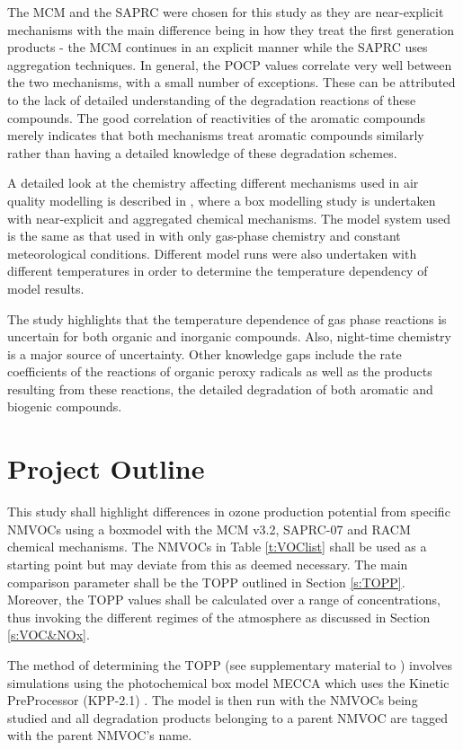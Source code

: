 The MCM and the SAPRC were chosen for this study as they are near-explicit mechanisms with the main difference being in how they
treat the first generation products - the MCM continues in an explicit manner while the SAPRC uses aggregation techniques. In 
general, the POCP values correlate very well between the two mechanisms, with a small number of exceptions. These can be 
attributed to the lack of detailed understanding of the degradation reactions of these compounds. The good correlation of 
reactivities of the aromatic compounds merely indicates that both mechanisms treat aromatic compounds similarly rather than 
having a detailed knowledge of these degradation schemes.

A detailed look at the chemistry affecting different mechanisms used in air quality modelling is described in 
\citep{Stockwell:2012}, where a box modelling study is undertaken with near-explicit and aggregated chemical mechanisms. The 
model system used is the same as that used in \citep{Seefeld:1999} with only gas-phase chemistry and constant meteorological 
conditions.  Different model runs were also undertaken with different temperatures in order to determine the temperature 
dependency of model results. 

The study highlights that the temperature dependence of gas phase reactions is uncertain for both organic and inorganic 
compounds. Also, night-time chemistry is a major source of uncertainty. Other knowledge gaps include the rate coefficients of 
the reactions of organic peroxy radicals as well as the products resulting from these reactions, the detailed degradation of 
both aromatic and biogenic compounds.

\section{Project Outline}
This study shall highlight differences in ozone production potential from specific NMVOCs using a boxmodel with the MCM v3.2, 
SAPRC-07 and RACM chemical mechanisms. The NMVOCs in Table \ref{t:VOClist} shall be used as a starting point but may deviate 
from this as deemed necessary. The main comparison parameter shall be the TOPP outlined in Section \ref{s:TOPP}. Moreover, the 
TOPP values shall be calculated over a range of  concentrations, thus invoking the different regimes of the atmosphere 
as discussed in Section \ref{s:VOC&NOx}.

The method of determining the TOPP (see supplementary material to \citep{Butler:2011}) involves simulations using the 
photochemical box model MECCA \citep{Sander:2005, Sander:2011} which uses the Kinetic PreProcessor (KPP-2.1) \citep{Sandu:2006}. 
The model is then run with the NMVOCs being studied and all degradation products belonging to a parent NMVOC are tagged with the
parent NMVOC's name. 

